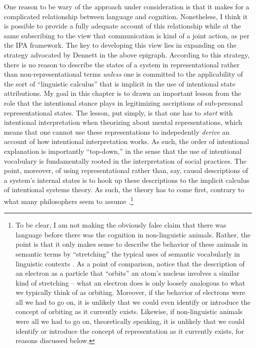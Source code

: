 One reason to be wary of the approach under consideration is that it makes for a complicated relationship between language and cognition. Nonetheless, I think it is possible to provide a fully adequate account of this relationship while at the same subscribing to the view that communication is kind of a joint action, as per the IPA framework. The key to developing this view lies in expanding on the strategy advocated by Dennett in the above epigraph. According to this strategy, there is no reason to describe the states of a system in representational rather than non-representational terms \textit{unless} one is committed to the applicability of the sort of ``linguistic calculus'' that is implicit in the use of intentional state attributions. My goal in this chapter is to drawn an important lesson from the role that the intentional stance plays in legitimizing ascriptions of sub-personal representational states. The lesson, put simply, is that one has to \textit{start} with intentional interpretation when theorizing about mental representations, which means that one cannot use these representations to indepedently \textit{derive} an account of how intentional interpretation works. As such, the order of intentional explanation is importantly ``top-down,'' in the sense that the use of intentional vocabulary is fundamentally rooted in the interpretation of social practices. The point, moreover, of using representational rather than, say, causal descriptions of a system's internal states is to hook up these descriptions to the implicit calculus of intentional systems theory. As such, the theory has to come first, contrary to what many philosophers seem to assume \citep[e.g.,][]{Millikan:1989,Fodor:1998,Dretske:1986}.\footnote{To be clear, I am not making the obviously false claim that there was language before there was the cognition in non-linguistic animals. Rather, the point is that it only makes sense to describe the behavior of these animals in semantic terms by ``stretching'' the typical uses of semantic vocabularly in linguistic contexts \citep[][p. 59]{Dennett:2010,Brandom:2010}. As a point of comparison, notice that the description of an electron as a particle that ``orbits'' an atom's nucleus involves a similar kind of stretching -- what an electron does is only loosely analogous to what we typically think of as orbiting. Moreover, if the behavior of electrons were all we had to go on, it is unlikely that we could even identify or introduce the concept of orbiting as it currently exists. Likewise, if non-linguistic animals were all we had to go on, theoretically speaking, it is unlikely that we could identify or introduce the concept of representation as it currently exists, for reasons discussed below.} 

